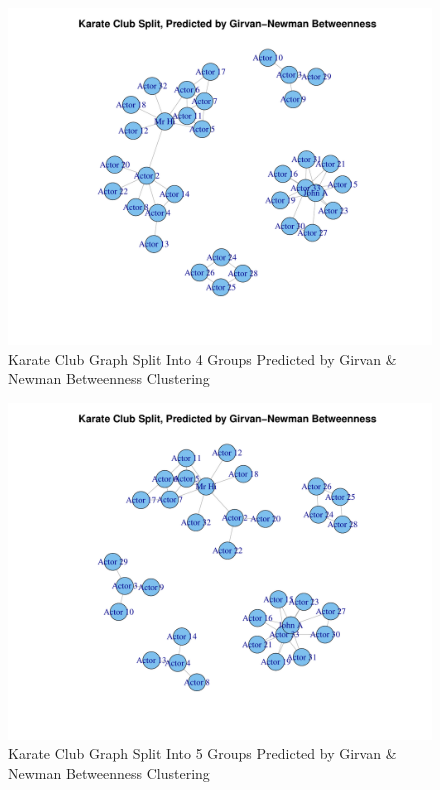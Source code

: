 \begin{figure}[h]
\includegraphics[scale=0.6]{R/group-of-4.pdf}
\caption{Karate Club Graph Split Into 4 Groups Predicted by Girvan \& Newman Betweenness Clustering}
\label{fig:club-4-split}
\end{figure}

\begin{figure}[h]
\includegraphics[scale=0.6]{R/group-of-5.pdf}
\caption{Karate Club Graph Split Into 5 Groups Predicted by Girvan \& Newman Betweenness Clustering}
\label{fig:club-5-split}
\end{figure}

